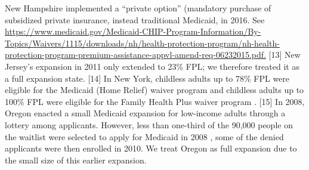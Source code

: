 \documentclass[12pt]{article}%
\begin{document}
\begin{appendices}
\begin{table}[]
\begin{scriptsize}
\begin{justify}
[12]  New Hampshire implemented a “private option” (mandatory purchase of subsidized private insurance, instead traditional Medicaid, in 2016.  See \url{https://www.medicaid.gov/Medicaid-CHIP-Program-Information/By-Topics/Waivers/1115/downloads/nh/health-protection-program/nh-health-protection-program-premium-assistance-appvl-amend-req-06232015.pdf.}
[13] New Jersey’s expansion in 2011 only extended to 23\% FPL; we therefore treated it as a full expansion state.
[14] In New York, childless adults up to 78\% FPL were eligible for the Medicaid (Home Relief) waiver program and childless adults up to 100\% FPL were eligible for the Family Health Plus waiver program \citep{heberleinHoldingSteadyLooking2011}.
[15] In 2008, Oregon enacted a small Medicaid expansion for low-income adults through a lottery among applicants. However, less than one-third of the 90,000 people on the waitlist were selected to apply for Medicaid in 2008 \citep{baickerOregonExperimentEffects2013}, some of the denied applicants were then enrolled in 2010.  
We treat Oregon as full expansion due to the small size of this earlier expansion.
\end{justify}
 \end{scriptsize}
\end{table}



\end{appendices}
\end{document}
